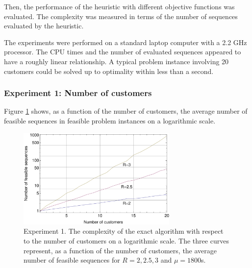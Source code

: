 \documentclass[dissertation,draft*]{aaltoseries}
\begin{document}
Then, the performance of the heuristic with different objective functions was evaluated.
The complexity was measured in terms of the number of sequences evaluated by the heuristic.

The experiments were performed on a standard laptop computer with a 2.2 GHz processor. 
The CPU times and the number of evaluated sequences appeared to have a roughly linear relationship.
A typical problem instance involving 20 customers could be solved up to optimality within less than a second.


\subsubsection{Experiment 1: Number of customers}
Figure \ref{nvertailu01} shows, as a function of the number of customers, the average number of feasible sequences in feasible problem instances 
on a logarithmic scale.


\begin{figure}
\centering
\includegraphics[width=0.7\textwidth]{nvertailu01.pdf}
\caption{Experiment 1. The complexity of the exact algorithm with respect to the number of customers on a logarithmic scale. 
The three curves represent, as a function of the number of customers, the average number of feasible sequences 
for $R=2,2.5,3$ and $\mu=1800$s. }
\label{nvertailu01}
\end{figure}
\end{document}
